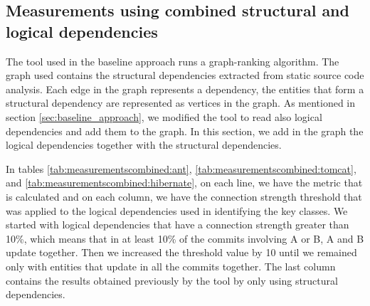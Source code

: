 \documentclass[runningheads]{comsis2}
\begin{document}
\begin{table}[!h]
\renewcommand{\arraystretch}{1}
\caption{ROC-AUC metric values extracted. }
\label{tab:previousresults}
\centering
{}
\end{table}





\subsection{Measurements using combined structural and logical dependencies}

The tool used in the baseline approach runs a graph-ranking algorithm. 
The graph used contains the structural dependencies extracted from static source code analysis.
Each edge in the graph represents a dependency, the entities that form a structural dependency are represented as vertices in the graph. 
As mentioned in section \ref{sec:baseline_approach}, we modified the tool to read also logical dependencies and add them to the graph. 
In this section, we add in the graph the logical dependencies together with the structural dependencies. 

In tables \ref{tab:measurementscombined:ant}, \ref{tab:measurementscombined:tomcat}, and \ref{tab:measurementscombined:hibernate}, on each line, we have the metric that is calculated and on each column, we have the connection strength threshold that was applied to the logical dependencies used in identifying the key classes.
We started with logical dependencies that have a connection strength greater than 10\%, which means that in at least 10\% of the commits involving A or B, A and B update together. Then we increased the threshold value by 10 until we remained only with entities that update in all the commits together. The last column contains the results obtained previously by the tool by only using structural dependencies.
\end{document}
